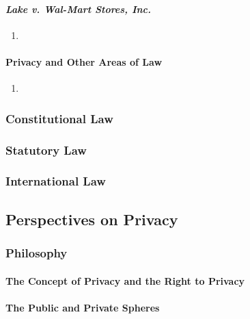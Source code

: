 \paragraph{\emph{Lake v. Wal-Mart Stores, Inc.}}

\begin{enumerate}
    \item %
\end{enumerate}

\paragraph{Privacy and Other Areas of Law}

\begin{enumerate}
    \item %
\end{enumerate}

\subsubsection{Constitutional Law}


\subsubsection{Statutory Law}


\subsubsection{International Law}


\subsection{Perspectives on Privacy}

\subsubsection{Philosophy}

\paragraph{The Concept of Privacy and the Right to Privacy}


\paragraph{The Public and Private Spheres}

